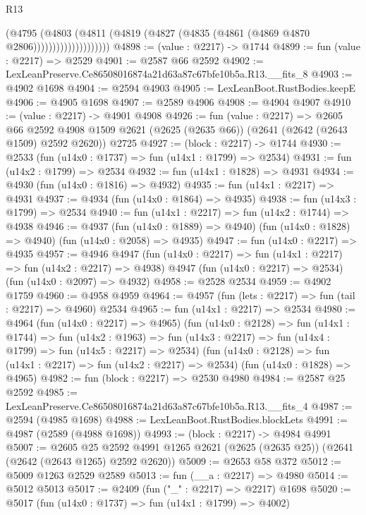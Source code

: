 \begin{lexlean}{R13}
\begin{coremodule}
                            (@4795
                              (@4803
                                (@4811
                                  (@4819 (@4827 (@4835 (@4861 (@4869 @4870 @2806))))))))))))))))))))
@4898 := (value : @2217) -> @1744
@4899 := fun (value : @2217) => @2529
@4901 := @2587 @66 @2592
@4902 := LexLeanPreserve.Ce86508016874a21d63a87c67bfe10b5a.R13.__fits_8
@4903 := @4902 @1698
@4904 := @2594 @4903
@4905 := LexLeanBoot.RustBodies.keepE
@4906 := @4905 @1698
@4907 := @2589 @4906
@4908 := @4904 @4907
@4910 := (value : @2217) -> @4901 @4908
@4926 := fun (value : @2217) =>
  @2605
    @66
    @2592
    @4908
    @1509
    @2621
    (@2625 (@2635 @66))
    (@2641 (@2642 (@2643 @1509) @2592 @2620))
    @2725
@4927 := (block : @2217) -> @1744
@4930 := @2533 (fun (u14x0 : @1737) => fun (u14x1 : @1799) => @2534)
@4931 := fun (u14x2 : @1799) => @2534
@4932 := fun (u14x1 : @1828) => @4931
@4934 := @4930 (fun (u14x0 : @1816) => @4932)
@4935 := fun (u14x1 : @2217) => @4931
@4937 := @4934 (fun (u14x0 : @1864) => @4935)
@4938 := fun (u14x3 : @1799) => @2534
@4940 := fun (u14x1 : @2217) => fun (u14x2 : @1744) => @4938
@4946 := @4937
    (fun (u14x0 : @1889) => @4940)
    (fun (u14x0 : @1828) => @4940)
    (fun (u14x0 : @2058) => @4935)
@4947 := fun (u14x0 : @2217) => @4935
@4957 := @4946
    @4947
    (fun (u14x0 : @2217) => fun (u14x1 : @2217) => fun (u14x2 : @2217) => @4938)
    @4947
    (fun (u14x0 : @2217) => @2534)
    (fun (u14x0 : @2097) => @4932)
@4958 := @2528 @2534
@4959 := @4902 @1759
@4960 := @4958 @4959
@4964 := @4957 (fun (lets : @2217) => fun (tail : @2217) => @4960) @2534
@4965 := fun (u14x1 : @2217) => @2534
@4980 := @4964
    (fun (u14x0 : @2217) => @4965)
    (fun (u14x0 : @2128) =>
    fun (u14x1 : @1744) =>
    fun (u14x2 : @1963) =>
    fun (u14x3 : @2217) => fun (u14x4 : @1799) => fun (u14x5 : @2217) => @2534)
    (fun (u14x0 : @2128) => fun (u14x1 : @2217) => fun (u14x2 : @2217) => @2534)
    (fun (u14x0 : @1828) => @4965)
@4982 := fun (block : @2217) => @2530 @4980
@4984 := @2587 @25 @2592
@4985 := LexLeanPreserve.Ce86508016874a21d63a87c67bfe10b5a.R13.__fits_4
@4987 := @2594 (@4985 @1698)
@4988 := LexLeanBoot.RustBodies.blockLets
@4991 := @4987 (@2589 (@4988 @1698))
@4993 := (block : @2217) -> @4984 @4991
@5007 := @2605
    @25
    @2592
    @4991
    @1265
    @2621
    (@2625 (@2635 @25))
    (@2641 (@2642 (@2643 @1265) @2592 @2620))
@5009 := @2653 @58 @372
@5012 := @5009 @1263 @2529 @2589
@5013 := fun (__a : @2217) => @4980
@5014 := @5012 @5013
@5017 := @2409 (fun ("_" : @2217) => @2217) @1698
@5020 := @5017 (fun (u14x0 : @1737) => fun (u14x1 : @1799) => @4002)

\end{coremodule}
\end{lexlean}
